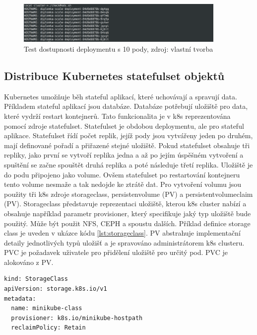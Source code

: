 \begin{figure}[H]
  \begin{centering}
    
	  \includegraphics[width=0.9\textwidth]{images/scale3.png}
    \par
	  \caption{Test dostupnosti deploymentu s 10 pody\label{fig:scale3},  zdroj: vlastní tvorba}
    \end{centering}
\end{figure}

\subsection{Distribuce Kubernetes statefulset objektů}
Kubernetes umožňuje běh stateful aplikací, které uchovávají a spravují data. Příkladem stateful aplikací jsou databáze. Databáze potřebují uložiště pro data, které vydrží restart kontejnerů. Tato funkcionalita je v k8s reprezentována pomocí zdroje statefulset. Statefulset je obdobou deploymentu, ale pro stateful aplikace. Statefulset řídí počet replik, jejíž pody jsou vytvářeny jeden po druhém, mají definované pořadí a přiřazené stejné uložiště. Pokud statefulset obsahuje tři repliky, jako první se vytvoří replika jedna a až po jejím úspěšném vytvoření a spuštění se začne spouštět druhá replika a poté následuje třetí replika. Uložiště je do podu připojeno jako volume. Ovšem statefulset po restartování kontejneru tento volume nesmaže a tak nedojde ke ztrátě dat. Pro vytvoření volumu jsou použity tři k8s zdroje storageclass, persistenvolume (PV) a persistentvolumeclaim (PV). Storageclass představuje reprezentaci uložiště, kterou k8s cluster nabízí a obsahuje například parametr provisioner, který specifikuje jaký typ uložiště bude použitý. Může být použit NFS, CEPH a spoustu dalších. Příklad definice storage class je uveden v ukázce kódu \ref{lst:storageclass}. PV abstrahuje implementační detaily jednotlivých typů uložišť a je spravováno administrátorem k8s clusteru. PVC je požadavek uživatele pro přidělení uložiště pro určitý pod. PVC je alokováno z PV. 

\begin{lstlisting}[caption={StorageClass definice pro minikube cluster},label=lst:storageclass]
kind: StorageClass
apiVersion: storage.k8s.io/v1
metadata:
  name: minikube-class
  provisioner: k8s.io/minikube-hostpath
  reclaimPolicy: Retain
\end{lstlisting}

